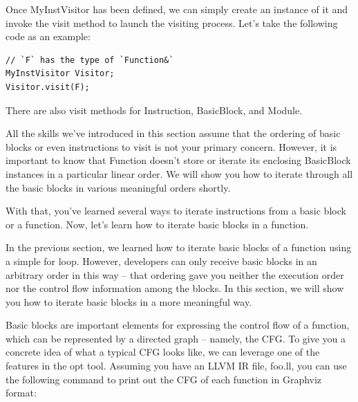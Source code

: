 Once MyInstVisitor has been defined, we can simply create an instance of it and invoke the visit method to launch the visiting process. Let's take the following code as an example:

\begin{lstlisting}[style=styleCXX]
// `F` has the type of `Function&`
MyInstVisitor Visitor;
Visitor.visit(F);
\end{lstlisting}

There are also visit methods for Instruction, BasicBlock, and Module.

\begin{tcolorbox}[colback=blue!5!white,colframe=blue!75!black, fonttitle=\bfseries,title=Ordering basic blocks and instructions]	
\hspace*{0.7cm}All the skills we've introduced in this section assume that the ordering of basic blocks or even instructions to visit is not your primary concern. However, it is important to know that Function doesn't store or iterate its enclosing BasicBlock instances in a particular linear order. We will show you how to iterate through all the basic blocks in various meaningful orders shortly.
\end{tcolorbox}

With that, you've learned several ways to iterate instructions from a basic block or a function. Now, let's learn how to iterate basic blocks in a function.


In the previous section, we learned how to iterate basic blocks of a function using a simple for loop. However, developers can only receive basic blocks in an arbitrary order in this way – that ordering gave you neither the execution order nor the control flow information among the blocks. In this section, we will show you how to iterate basic blocks in a more meaningful way.

Basic blocks are important elements for expressing the control flow of a function, which can be represented by a directed graph – namely, the CFG. To give you a concrete idea of what a typical CFG looks like, we can leverage one of the features in the opt tool. Assuming you have an LLVM IR file, foo.ll, you can use the following command to print out the CFG of each function in Graphviz format:



